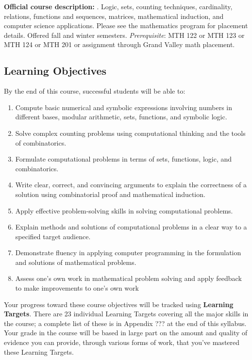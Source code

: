 \documentclass[]{article}
\providecommand{\tightlist}{%
  \setlength{\itemsep}{0pt}\setlength{\parskip}{0pt}}
\begin{document}
\textbf{Official course description:} . Logic, sets, counting
techniques, cardinality, relations, functions and sequences, matrices,
mathematical induction, and computer science applications. Please see
the mathematics program for placement details. Offered fall and winter
semesters. \emph{Prerequisite}: MTH 122 or MTH 123 or MTH 124 or MTH 201
or assignment through Grand Valley math placement.

\hypertarget{learning-objectives}{%
\subsection{Learning Objectives}\label{learning-objectives}}

By the end of this course, successful students will be able to:

\begin{enumerate}
\def\labelenumi{\arabic{enumi}.}
\tightlist
\item
  Compute basic numerical and symbolic expressions involving numbers in
  different bases, modular arithmetic, sets, functions, and symbolic
  logic.
\item
  Solve complex counting problems using computational thinking and the
  tools of combinatorics.
\item
  Formulate computational problems in terms of sets, functions, logic,
  and combinatorics.
\item
  Write clear, correct, and convincing arguments to explain the
  correctness of a solution using combinatorial proof and mathematical
  induction.
\item
  Apply effective problem-solving skills in solving computational
  problems.
\item
  Explain methods and solutions of computational problems in a clear way
  to a specified target audience.
\item
  Demonstrate fluency in applying computer programming in the
  formulation and solutions of mathematical problems.
\item
  Assess one's own work in mathematical problem solving and apply
  feedback to make improvements to one's own work
\end{enumerate}

Your progress toward these course objectives will be tracked using
\textbf{Learning Targets}. There are 23 individual Learning Targets
covering all the major skills in the course; a complete list of these is
in Appendix ??? at the end of this syllabus. Your grade in the course
will be based in large part on the amount and quality of evidence you
can provide, through various forms of work, that you've mastered these
Learning Targets.
\end{document}
